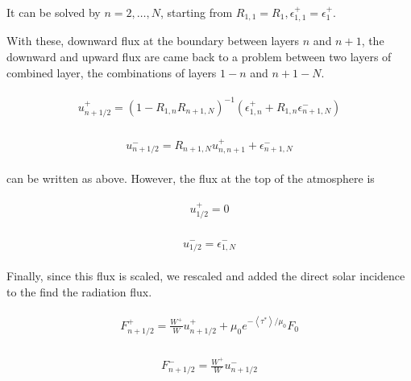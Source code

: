 It can be solved by \(n=2,\dots, N\), starting from \(R_{1,1}=R_{1}, \epsilon_{1,1}^{+}=\epsilon_{1}^{+}\).

With these, downward flux at the boundary between layers \(n\) and \(n+1\), the downward and upward flux are came back to a problem between two layers of combined layer, the combinations of layers
\(1-n\) and \(n+1-N\).

\begin{eqnarray}
\begin{array}{c}
u_{n+1 / 2}^{+}=\left(1-R_{1, n} R_{n+1, N}\right)^{-1}\left(\epsilon_{1, n}^{+}+R_{1, n} \epsilon_{n+1, N}^{-}\right)
\end{array}
\end{eqnarray}

\begin{eqnarray}
\begin{array}{c}
u_{n+1 / 2}^{-}=R_{n+1, N} u_{n, n+1}^{+}+\epsilon_{n+1, N}^{-}
\end{array}
\end{eqnarray}

can be written as above. However, the flux at the top of the atmosphere is

\begin{eqnarray}
\begin{array}{c}
u_{1 / 2}^{+}=0
\end{array}
\end{eqnarray}

\begin{eqnarray}
\begin{array}{c}
u_{1 / 2}^{-}=\epsilon_{1, N}^{-}
\end{array}
\end{eqnarray}

Finally, since this flux is scaled, we rescaled and added the direct solar incidence to the find the radiation flux.

\begin{eqnarray}
\begin{array}{c}
F_{n+1 / 2}^{+}=\frac{W^{+}}{W} u_{n+1 / 2}^{+}+\mu_{0} e^{-\left\langle\tau^{*}\right\rangle / \mu_{0}} F_{0}
\end{array}
\end{eqnarray}

\begin{eqnarray}
\begin{array}{c}
F_{n+1 / 2}^{-}=\frac{W^{+}}{W} u_{n+1 / 2}^{-}
\end{array}
\end{eqnarray}

